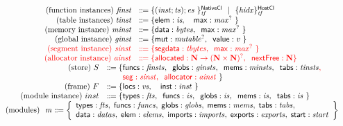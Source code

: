 \documentclass{standalone}
\begin{document}
\[
  \begin{array}{c}
    \begin{array}{rl}
      \text{(function instances)} ~\textit{finst} &\dotdoteq  \NCl{\V{tf}}{(\V{inst};\V{ts})}{\V{es}~}~~|~~\HCl{\V{tf}}{\V{hidx}}
      \\
      \text{(table instances)} ~\textit{tinst} &\dotdoteq \{ \xxfield{elem} : \textit{is}, \quad \xxfield{max} : \V{max^{?}} ~ \}
      \\
      \text{(memory instance)} ~\textit{minst} &\dotdoteq \{ \xxfield{data} : \V{bytes}, \;\;  \xxfield{max} : \V{max^{?}} ~ \} \
      \\
      \text{(global instance)} ~\textit{ginst} &\dotdoteq \{ \xxfield{mut} : \V{mutable^{?}}, \;\;  \xxfield{value} : \V{v} ~ \} \
      \\
      \rr{\text{(segment instance)} ~\V{sinst}} & \rr{\dotdoteq \{ \xxfield{segdata} : \V{tbytes}, \;\; \xxfield{max} : \V{max^{?}} ~ \}} \
      \\
      \rr{\text{(allocator instance)} ~\V{ainst}} & \rr{\dotdoteq \{ \xxfield{allocated} : \xxCN\to(\xxCN\times\xxCN)^?,\;\; \xxfield{nextFree} : \xxCN \}} \
    \end{array}
    \\
    \begin{array}{rl}
      \text{(store)} ~ S  & \dotdoteq  \{  \begin{array}[t]{@{}l@{}} \xxfield{funcs} : \V{finsts}, \;\; \xxfield{globs} : \V{ginsts}, \;\; \xxfield{mems} : \V{minsts}, \;\; \xxfield{tabs} : \V{tinsts}\rr{,} \\
        \rr{\xxfield{seg}:\V{sinst},\;\; \xxfield{allocator}:\V{ainst}} ~ \} \end{array} \
      \\
      \text{(frame)} ~ F &\dotdoteq \{ \xxfield{locs} : \V{vs}, \quad \xxfield{inst} : \V{inst} ~ \}
      \\
      \text{(module instance)} ~ inst &\dotdoteq \{ \xxfield{types} : \V{fts}, \;\;  \xxfield{funcs} : \V{is}, \;\; \xxfield{globs} : \V{is}, \;\; \xxfield{mems} : \V{is}, \;\; \xxfield{tabs} : \V{is} ~ \}
    \end{array}
    \\
    \begin{array}{l}
    \text{(modules)}~~\V{m} \dotdoteq
    \left\{
    \begin{array}{l}
      {\xxfield{types} : \V{fts},\; \xxfield{funcs} : \V{funcs}, \; \xxfield{globs} : \V{globs}, \; \xxfield{mems} : \V{mems}, \; \xxfield{tabs} : \V{tabs},}
      \\
      {\xxfield{data} : \V{datas}, \; \xxfield{elem} : \V{elems}, \; \xxfield{imports} : \V{imports}, \; \xxfield{exports} : \V{exports}, \; \xxfield{start} : \V{start}}
    \end{array}
    \right\}
  \end{array}
  \end{array}
\]
\end{document}
